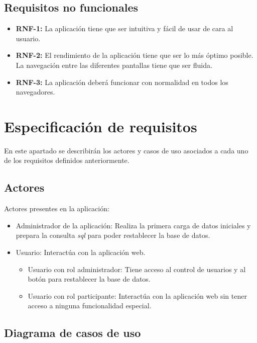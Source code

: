 \subsection{Requisitos no funcionales}

	\begin{itemize}
	
		\item \textbf{RNF-1:} La aplicación tiene que ser intuitiva y fácil de usar de cara al usuario.
		\item \textbf{RNF-2:} El rendimiento de la aplicación tiene que ser lo más óptimo posible. La navegación entre las diferentes pantallas tiene que ser fluida. 
		\item \textbf{RNF-3:} La aplicación deberá funcionar con normalidad en todos los navegadores.
		
	\end{itemize}
	
\newpage

\section{Especificación de requisitos}

En este apartado se describirán los actores y casos de uso asociados a cada uno de los requisitos definidos anteriormente. 

\subsection{Actores}

Actores presentes en la aplicación:

\begin{itemize}
	\item Administrador de la aplicación: Realiza la primera carga de datos iniciales y prepara la consulta \textit{sql} para poder restablecer la base de datos.
	\item Usuario: Interactúa con la aplicación web.
	\begin{itemize}
		\item Usuario con rol administrador: Tiene acceso al control de usuarios y al botón para restablecer la base de datos.
		\item Usuario con rol participante: Interactúa con la aplicación web sin tener acceso a ninguna funcionalidad especial.
	\end{itemize}
\end{itemize}

\subsection{Diagrama de casos de uso}

